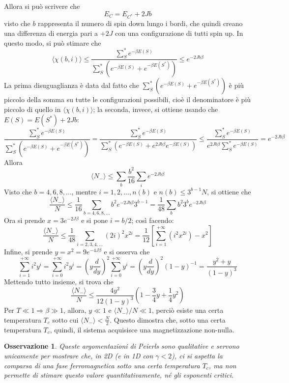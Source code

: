 \documentclass[11pt, a4paper]{scrartcl}
\theoremstyle{style}
\newtheorem{osservazione}{Osservazione}[section]
\theoremstyle{style1}
\numberwithin{equation}{subsection}
\begin{document}
Allora si pu\`o scrivere che 
\[
E_C = E_{C^*} +2Jb
\] 
visto che $b$ rappresenta il numero di spin down lungo i bordi, che quindi creano una differenza di energia pari a $+2J$ con una configurazione di tutti spin up.
In questo modo, si pu\`o stimare che
\[
	\langle \chi (b,i) \rangle \le  \frac{\sum_{S}^{*} e^{-\beta E(S)}}{\sum_{S}^{*} \left(e^{-\beta E(S)} + e^{-\beta E(S^*)}\right) }\le  e^{-2Jb \beta }
\] 
La prima disuguaglianza \`e data dal fatto che $\sum_{S}^{*} \left(e^{-\beta E(S)} + e^{-\beta E(S^*)}\right) $ \`e pi\`u piccolo della somma su tutte le configurazioni possibili, cio\`e il denominatore \`e pi\`u piccolo di quello in $\langle \chi (b,i) \rangle$; la seconda, invece, si ottiene usando che $E(S) = E(S^*) + 2Jb$:
\[
\frac{\sum_{S}^{*} e^{-\beta E(S)}}{\sum_{S}^{*} \left(e^{-\beta E(S)} + e^{-\beta E(S^*)}\right) } = \frac{\sum_{S}^{*} e^{-\beta E(S)}}{\sum_{S}^{*} \left(e^{-\beta E(S)} + e^{2Jb \beta } e^{-\beta E(S)}\right) }\le \frac{\sum_{S}^{*} e^{-\beta E(S)}}{e^{2J b \beta }\sum_{S}^{*} e^{-\beta E(S)}} = e^{-2J b \beta }
\] 
Allora
\[
\langle N_- \rangle \le \sum_{b}^{} \frac{b^2}{16}\sum_{i}^{} e^{-2Jb \beta }
\] 
Visto che $b=4,6,8,\ldots$, mentre $i=1,2,\ldots,n(b)$ e $n(b)\le 3^{b-1}N$, si ottiene che
\[
\frac{\langle N_- \rangle}{N} \le \frac{1}{16}\sum_{b=4,6,8,\ldots}^{} b^2 e^{-2Jb \beta } 3^{b-1} = \frac{1}{48}\sum_{b}^{} b^2 3^b e^{-2 J b \beta }
\] 
Ora si prende $x=3 e^{-2  J \beta }$ e si pone $i= b / 2$; cos\`i facendo:
\[
\frac{\langle N_- \rangle}{N}\le \frac{1}{48}\sum_{i=2,3,4,\ldots}^{} (2i)^2 x ^{2i} = \frac{1}{12} \left[ \sum_{i=1}^{+\infty} \left(i^2 x ^{2i}\right) -x^2 \right] 
\] 
Infine, si prende $y = x^2 = 9 e^{-4 J \beta }$ e si osserva che 
\[
\sum_{i=1}^{+\infty} i^2 y ^i=\sum_{i=0}^{+\infty} i^2 y ^i=\left(y \frac{d}{dy}\right) ^2 \sum_{i=0}^{+\infty} y^i = \left(y\frac{d }{d y} \right) ^2(1-y)^{-1} =\frac{y^2+y}{(1-y)^3}
\] 
Mettendo tutto insieme, si trova che
\[
\frac{\langle N_- \rangle}{N}\le \frac{4y^2}{12(1-y)^3}\left(1-\frac{3}{4}y + \frac{1}{4}y^2\right)
\] 
Per $T\ll 1\Rightarrow \beta \gg 1$, allora, $y \ll 1$ e $\langle N_- \rangle / N \ll 1$, perci\`o esiste una certa temperatura $T_c$ sotto cui $\langle N_- \rangle< \frac{N}{2}$.
Questo dimostra che, sotto una certa temperatura $T_c$, quindi, il sistema acquisisce una magnetizzazione non-nulla.
\begin{osservazione}
Queste argomentazioni di Peierls sono qualitative e servono unicamente per mostrare che, in 2D (e in 1D con $\gamma<2$), ci si aspetta la comparsa di una fase ferromagnetica sotto una certa temperatura $T_c$, ma non permette di stimare questo valore quantitativamente, n\'e gli esponenti critici.
\end{osservazione}
\end{document}
